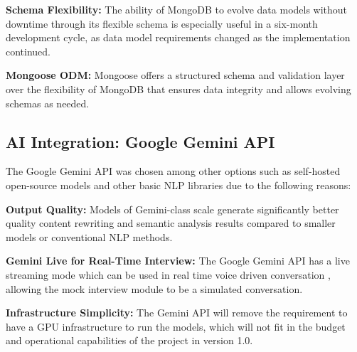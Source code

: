 \documentclass[12pt, a4paper, oneside]{report}
\begin{document}
\textbf{Schema Flexibility:} The ability of MongoDB to evolve data models without downtime through its flexible schema is especially useful in a six-month development cycle, as data model requirements changed as the implementation continued.

\textbf{Mongoose ODM:} Mongoose \cite{mongoose2024} offers a structured schema and validation layer over the flexibility of MongoDB that ensures data integrity and allows evolving schemas as needed.

\subsection{AI Integration: Google Gemini API}

The Google Gemini API \cite{gemini2023} was chosen among other options such as self-hosted open-source models and other basic NLP libraries due to the following reasons:

\textbf{Output Quality:} Models of Gemini-class scale generate significantly better quality content rewriting and semantic analysis results compared to smaller models or conventional NLP methods.

\textbf{Gemini Live for Real-Time Interview:} The Google Gemini API has a live streaming mode which can be used in real time voice driven conversation \cite{geminidocs2024}, allowing the mock interview module to be a simulated conversation.

\textbf{Infrastructure Simplicity:} The Gemini API will remove the requirement to have a GPU infrastructure to run the models, which will not fit in the budget and operational capabilities of the project in version 1.0.
\end{document}
